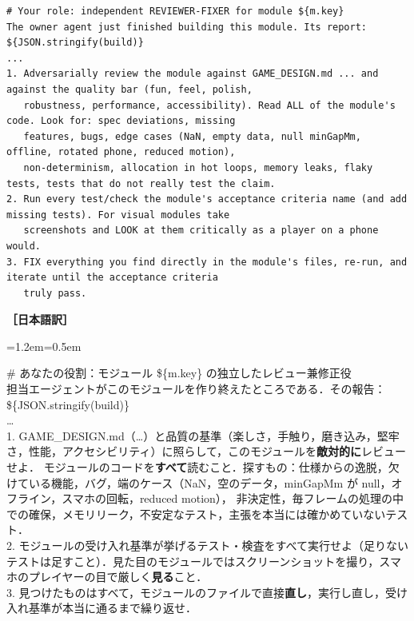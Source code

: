\documentclass[a4paper,10pt]{ltjsarticle}
\newenvironment{yaku}{\par\vspace{-2pt}\small\noindent\textbf{［日本語訳］}\par\nopagebreak\begin{list}{}{\leftmargin=1.2em\rightmargin=0.5em\topsep=1pt}\item\relax}{\end{list}\vspace{4pt}}
\begin{document}
\begin{lstlisting}[caption={レビュー役への指示}]
# Your role: independent REVIEWER-FIXER for module ${m.key}
The owner agent just finished building this module. Its report: ${JSON.stringify(build)}
...
1. Adversarially review the module against GAME_DESIGN.md ... and against the quality bar (fun, feel, polish,
   robustness, performance, accessibility). Read ALL of the module's code. Look for: spec deviations, missing
   features, bugs, edge cases (NaN, empty data, null minGapMm, offline, rotated phone, reduced motion),
   non-determinism, allocation in hot loops, memory leaks, flaky tests, tests that do not really test the claim.
2. Run every test/check the module's acceptance criteria name (and add missing tests). For visual modules take
   screenshots and LOOK at them critically as a player on a phone would.
3. FIX everything you find directly in the module's files, re-run, and iterate until the acceptance criteria
   truly pass.
\end{lstlisting}
\begin{yaku}
\# あなたの役割：モジュール \$\{m.key\} の独立したレビュー兼修正役\\
担当エージェントがこのモジュールを作り終えたところである．その報告：\$\{JSON.stringify(build)\}\\
…\\
1. GAME\_DESIGN.md（…）と品質の基準（楽しさ，手触り，磨き込み，堅牢さ，性能，アクセシビリティ）に照らして，このモジュールを\textbf{敵対的に}レビューせよ．
モジュールのコードを\textbf{すべて}読むこと．探すもの：仕様からの逸脱，欠けている機能，バグ，端のケース（NaN，空のデータ，minGapMm が null，オフライン，スマホの回転，reduced motion），
非決定性，毎フレームの処理の中での確保，メモリリーク，不安定なテスト，主張を本当には確かめていないテスト．\\
2. モジュールの受け入れ基準が挙げるテスト・検査をすべて実行せよ（足りないテストは足すこと）．見た目のモジュールではスクリーンショットを撮り，スマホのプレイヤーの目で厳しく\textbf{見る}こと．\\
3. 見つけたものはすべて，モジュールのファイルで直接\textbf{直し}，実行し直し，受け入れ基準が本当に通るまで繰り返せ．
\end{yaku}
\end{document}
